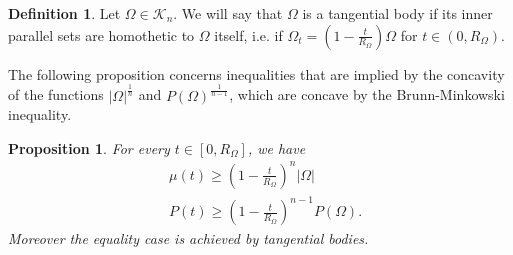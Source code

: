 \documentclass[oneside,a4paper,11pt,notitlepage]{article}
\newcommand{\abs}[1]{{\left|#1\right|}}
\theoremstyle{definition}
\newtheorem{definizione}{Definition}[section]
\theoremstyle{plain}
\newtheorem{prop}[teorema]{Proposition}
\theoremstyle{definition}
\begin{document}
\begin{definizione}
Let $\Omega \in \mathcal{K}_n$. We will say that $\Omega$ is a tangential body if its inner parallel sets are homothetic to $\Omega$ itself, i.e. if $\Omega_{t}= (1-\frac{t}{R_\Omega}) \Omega $ for $t \in (0,R_\Omega)$.
\end{definizione}
The following proposition concerns inequalities that are implied by the concavity of the functions $\abs{\Omega}^{\frac1n}$ and $P(\Omega)^{\frac{1}{n-1}}$, which are concave by the Brunn-Minkowski inequality. 

\begin{prop}
\label{prop:concavitymeasure}
For every $t \in [0,R_\Omega]$, we have
\begin{equation}\label{eq:concavity}
\begin{split}
& \mu(t)\ge \left(1-\frac{t}{R_\Omega}\right)^{n}\abs{\Omega}\\
&P(t) \ge \left(1-\frac{t}{R_\Omega}\right)^{n-1} P(\Omega).
  \end{split}  
\end{equation}
Moreover the equality case is achieved by tangential bodies.

\end{prop}
\end{document}
